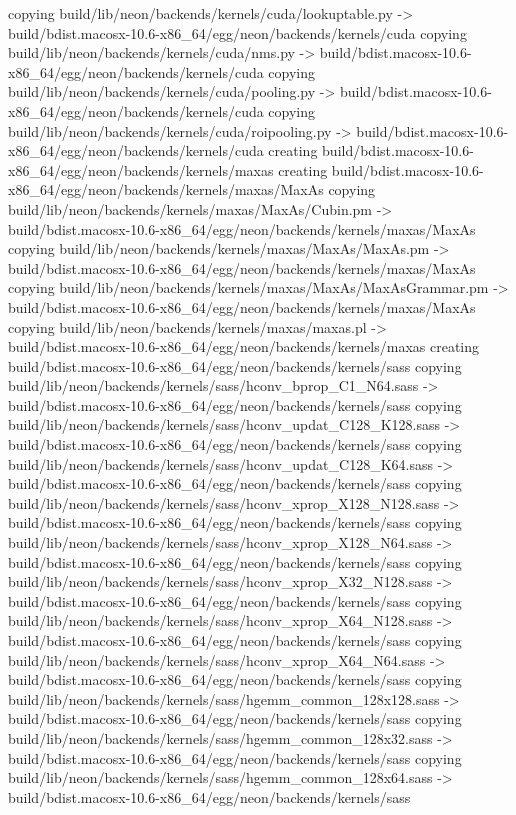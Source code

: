 copying build/lib/neon/backends/kernels/cuda/lookuptable.py -> build/bdist.macosx-10.6-x86_64/egg/neon/backends/kernels/cuda
copying build/lib/neon/backends/kernels/cuda/nms.py -> build/bdist.macosx-10.6-x86_64/egg/neon/backends/kernels/cuda
copying build/lib/neon/backends/kernels/cuda/pooling.py -> build/bdist.macosx-10.6-x86_64/egg/neon/backends/kernels/cuda
copying build/lib/neon/backends/kernels/cuda/roipooling.py -> build/bdist.macosx-10.6-x86_64/egg/neon/backends/kernels/cuda
creating build/bdist.macosx-10.6-x86_64/egg/neon/backends/kernels/maxas
creating build/bdist.macosx-10.6-x86_64/egg/neon/backends/kernels/maxas/MaxAs
copying build/lib/neon/backends/kernels/maxas/MaxAs/Cubin.pm -> build/bdist.macosx-10.6-x86_64/egg/neon/backends/kernels/maxas/MaxAs
copying build/lib/neon/backends/kernels/maxas/MaxAs/MaxAs.pm -> build/bdist.macosx-10.6-x86_64/egg/neon/backends/kernels/maxas/MaxAs
copying build/lib/neon/backends/kernels/maxas/MaxAs/MaxAsGrammar.pm -> build/bdist.macosx-10.6-x86_64/egg/neon/backends/kernels/maxas/MaxAs
copying build/lib/neon/backends/kernels/maxas/maxas.pl -> build/bdist.macosx-10.6-x86_64/egg/neon/backends/kernels/maxas
creating build/bdist.macosx-10.6-x86_64/egg/neon/backends/kernels/sass
copying build/lib/neon/backends/kernels/sass/hconv_bprop_C1_N64.sass -> build/bdist.macosx-10.6-x86_64/egg/neon/backends/kernels/sass
copying build/lib/neon/backends/kernels/sass/hconv_updat_C128_K128.sass -> build/bdist.macosx-10.6-x86_64/egg/neon/backends/kernels/sass
copying build/lib/neon/backends/kernels/sass/hconv_updat_C128_K64.sass -> build/bdist.macosx-10.6-x86_64/egg/neon/backends/kernels/sass
copying build/lib/neon/backends/kernels/sass/hconv_xprop_X128_N128.sass -> build/bdist.macosx-10.6-x86_64/egg/neon/backends/kernels/sass
copying build/lib/neon/backends/kernels/sass/hconv_xprop_X128_N64.sass -> build/bdist.macosx-10.6-x86_64/egg/neon/backends/kernels/sass
copying build/lib/neon/backends/kernels/sass/hconv_xprop_X32_N128.sass -> build/bdist.macosx-10.6-x86_64/egg/neon/backends/kernels/sass
copying build/lib/neon/backends/kernels/sass/hconv_xprop_X64_N128.sass -> build/bdist.macosx-10.6-x86_64/egg/neon/backends/kernels/sass
copying build/lib/neon/backends/kernels/sass/hconv_xprop_X64_N64.sass -> build/bdist.macosx-10.6-x86_64/egg/neon/backends/kernels/sass
copying build/lib/neon/backends/kernels/sass/hgemm_common_128x128.sass -> build/bdist.macosx-10.6-x86_64/egg/neon/backends/kernels/sass
copying build/lib/neon/backends/kernels/sass/hgemm_common_128x32.sass -> build/bdist.macosx-10.6-x86_64/egg/neon/backends/kernels/sass
copying build/lib/neon/backends/kernels/sass/hgemm_common_128x64.sass -> build/bdist.macosx-10.6-x86_64/egg/neon/backends/kernels/sass
